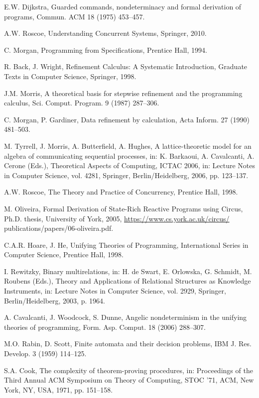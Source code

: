\documentclass[11pt]{article}
\begin{document}
\begin{enumerate}[label={[\arabic*]}, leftmargin=*, itemsep=0.4em]
\item E.W. Dijkstra, Guarded commands, nondeterminacy and formal derivation of programs, Commun. ACM 18 (1975) 453–457.
\item A.W. Roscoe, Understanding Concurrent Systems, Springer, 2010.
\item C. Morgan, Programming from Specifications, Prentice Hall, 1994.
\item R. Back, J. Wright, Refinement Calculus: A Systematic Introduction, Graduate Texts in Computer Science, Springer, 1998.
\item J.M. Morris, A theoretical basis for stepwise refinement and the programming calculus, Sci. Comput. Program. 9 (1987) 287–306.
\item C. Morgan, P. Gardiner, Data refinement by calculation, Acta Inform. 27 (1990) 481–503.
\item M. Tyrrell, J. Morris, A. Butterfield, A. Hughes, A lattice-theoretic model for an algebra of communicating sequential processes, in: K. Barkaoui, A. Cavalcanti, A. Cerone (Eds.), Theoretical Aspects of Computing, ICTAC 2006, in: Lecture Notes in Computer Science, vol. 4281, Springer, Berlin/Heidelberg, 2006, pp. 123–137.
\item A.W. Roscoe, The Theory and Practice of Concurrency, Prentice Hall, 1998.
\item M. Oliveira, Formal Derivation of State-Rich Reactive Programs using Circus, Ph.D. thesis, University of York, 2005, \url{https://www.cs.york.ac.uk/circus/} publications/papers/06-oliveira.pdf.
\item C.A.R. Hoare, J. He, Unifying Theories of Programming, International Series in Computer Science, Prentice Hall, 1998.
\item I. Rewitzky, Binary multirelations, in: H. de Swart, E. Orlowska, G. Schmidt, M. Roubens (Eds.), Theory and Applications of Relational Structures as Knowledge Instruments, in: Lecture Notes in Computer Science, vol. 2929, Springer, Berlin/Heidelberg, 2003, p. 1964.
\item A. Cavalcanti, J. Woodcock, S. Dunne, Angelic nondeterminism in the unifying theories of programming, Form. Asp. Comput. 18 (2006) 288–307.
\item M.O. Rabin, D. Scott, Finite automata and their decision problems, IBM J. Res. Develop. 3 (1959) 114–125.
\item S.A. Cook, The complexity of theorem-proving procedures, in: Proceedings of the Third Annual ACM Symposium on Theory of Computing, STOC ’71, ACM, New York, NY, USA, 1971, pp. 151–158.

\end{enumerate}
\end{document}
